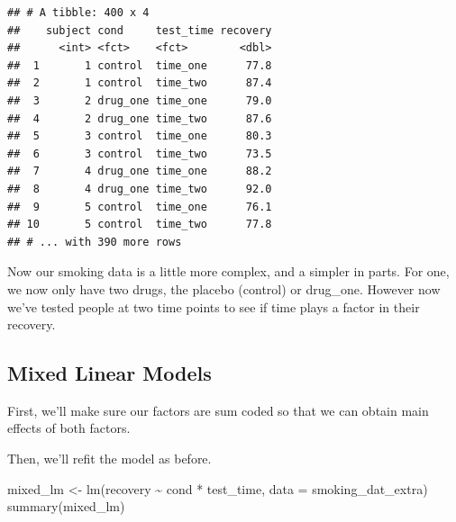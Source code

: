 \documentclass[
]{book}
\newenvironment{Shaded}{\begin{snugshade}}{\end{snugshade}}
\newcommand{\AttributeTok}[1]{\textcolor[rgb]{0.77,0.63,0.00}{#1}}
\newcommand{\FunctionTok}[1]{\textcolor[rgb]{0.00,0.00,0.00}{#1}}
\newcommand{\NormalTok}[1]{#1}
\newcommand{\OtherTok}[1]{\textcolor[rgb]{0.56,0.35,0.01}{#1}}
\newcommand{\SpecialCharTok}[1]{\textcolor[rgb]{0.00,0.00,0.00}{#1}}
\begin{document}
\begin{verbatim}
## # A tibble: 400 x 4
##    subject cond     test_time recovery
##      <int> <fct>    <fct>        <dbl>
##  1       1 control  time_one      77.8
##  2       1 control  time_two      87.4
##  3       2 drug_one time_one      79.0
##  4       2 drug_one time_two      87.6
##  5       3 control  time_one      80.3
##  6       3 control  time_two      73.5
##  7       4 drug_one time_one      88.2
##  8       4 drug_one time_two      92.0
##  9       5 control  time_one      76.1
## 10       5 control  time_two      77.8
## # ... with 390 more rows
\end{verbatim}

Now our smoking data is a little more complex, and a simpler in parts. For one, we now only have two drugs, the placebo (control) or drug\_one. However now we've tested people at two time points to see if time plays a factor in their recovery.

\hypertarget{mixed-linear-models}{%
\subsection{Mixed Linear Models}\label{mixed-linear-models}}

First, we'll make sure our factors are sum coded so that we can obtain main effects of both factors.

\begin{Shaded}
\end{Shaded}

Then, we'll refit the model as before.

\begin{Shaded}
\begin{Highlighting}[]
\NormalTok{mixed\_lm }\OtherTok{\textless{}{-}} \FunctionTok{lm}\NormalTok{(recovery }\SpecialCharTok{\textasciitilde{}}\NormalTok{ cond }\SpecialCharTok{*}\NormalTok{ test\_time, }
                 \AttributeTok{data =}\NormalTok{ smoking\_dat\_extra)}
\FunctionTok{summary}\NormalTok{(mixed\_lm)}
\end{Highlighting}
\end{Shaded}
\end{document}
